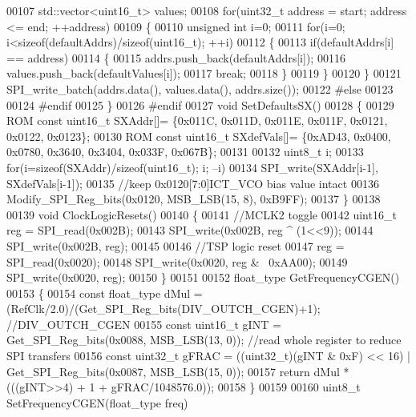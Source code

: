 \begin{DoxyCode}
00107     std::vector<uint16\_t> values;
00108     \textcolor{keywordflow}{for}(uint32\_t address = start; address <= end; ++address)
00109     \{
00110         \textcolor{keywordtype}{unsigned} \textcolor{keywordtype}{int} i=0;
00111         \textcolor{keywordflow}{for}(i=0; i<\textcolor{keyword}{sizeof}(defaultAddrs)/\textcolor{keyword}{sizeof}(uint16\_t); ++i)
00112         \{
00113             \textcolor{keywordflow}{if}(defaultAddrs[i] == address)
00114             \{
00115                 addrs.push\_back(defaultAddrs[i]);
00116                 values.push\_back(defaultValues[i]);
00117                 \textcolor{keywordflow}{break};
00118             \}
00119         \}
00120     \}
00121     SPI_write_batch(addrs.data(), values.data(), addrs.size());
00122 \textcolor{preprocessor}{#else}
00123 
00124 \textcolor{preprocessor}{#endif}
00125 \}
00126 \textcolor{preprocessor}{#endif}
00127 \textcolor{keywordtype}{void} SetDefaultsSX()
00128 \{
00129     ROM \textcolor{keyword}{const} uint16\_t SXAddr[]=    \{0x011C, 0x011D, 0x011E, 0x011F, 0x0121, 0x0122, 0x0123\};
00130     ROM \textcolor{keyword}{const} uint16\_t SXdefVals[]= \{0xAD43, 0x0400, 0x0780, 0x3640, 0x3404, 0x033F, 0x067B\};
00131 
00132     uint8\_t i;
00133     \textcolor{keywordflow}{for}(i=\textcolor{keyword}{sizeof}(SXAddr)/\textcolor{keyword}{sizeof}(uint16\_t); i; --i)
00134         SPI_write(SXAddr[i-1], SXdefVals[i-1]);
00135     \textcolor{comment}{//keep 0x0120[7:0]ICT\_VCO bias value intact}
00136     Modify_SPI_Reg_bits(0x0120, MSB_LSB(15, 8), 0xB9FF);
00137 \}
00138 
00139 \textcolor{keywordtype}{void} ClockLogicResets()
00140 \{
00141     \textcolor{comment}{//MCLK2 toggle}
00142     uint16\_t reg = SPI_read(0x002B);
00143     SPI_write(0x002B, reg ^ (1<<9));
00144     SPI_write(0x002B, reg);
00145 
00146     \textcolor{comment}{//TSP logic reset}
00147     reg = SPI_read(0x0020);
00148     SPI_write(0x0020, reg & ~0xAA00);
00149     SPI_write(0x0020, reg);
00150 \}
00151 
00152 float_type GetFrequencyCGEN()
00153 \{
00154     \textcolor{keyword}{const} float_type dMul = (RefClk/2.0)/(Get_SPI_Reg_bits(DIV_OUTCH_CGEN)+1); \textcolor{comment}{//DIV\_OUTCH\_CGEN}
00155     \textcolor{keyword}{const} uint16\_t gINT = Get_SPI_Reg_bits(0x0088, MSB_LSB(13, 0)); \textcolor{comment}{//read whole register to reduce SPI
       transfers}
00156     \textcolor{keyword}{const} uint32\_t gFRAC = ((uint32\_t)(gINT & 0xF) << 16) | Get_SPI_Reg_bits(0x0087, 
      MSB_LSB(15, 0));
00157     \textcolor{keywordflow}{return} dMul * (((gINT>>4) + 1 + gFRAC/1048576.0));
00158 \}
00159 
00160 uint8\_t SetFrequencyCGEN(float_type freq)

\end{DoxyCode}
